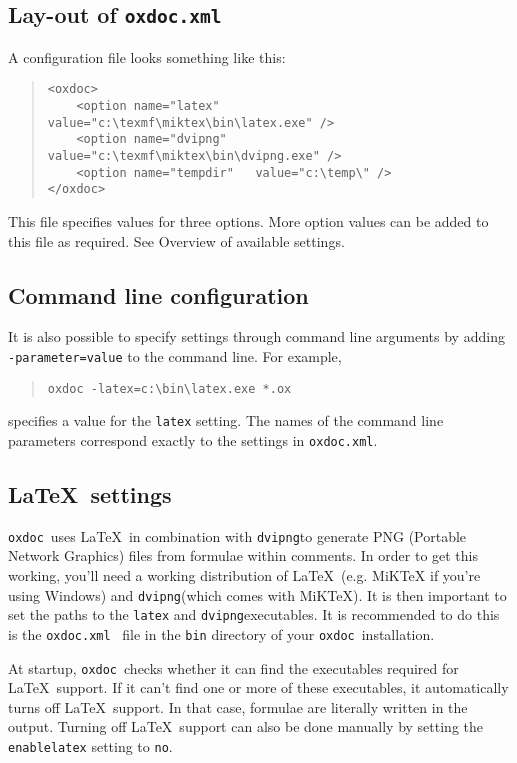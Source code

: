 \documentclass{article}
\newcommand\oxdoc{{\tt oxdoc}}
\newcommand\oxdocxml{{\tt oxdoc.xml}}
\newcommand\dvipng{{\tt dvipng}}
\begin{document}
\subsection{Lay-out of \oxdocxml}
A configuration file looks something like this:

\begin{quote}
\begin{verbatim}
<oxdoc>
	<option name="latex"     value="c:\texmf\miktex\bin\latex.exe" />
	<option name="dvipng"    value="c:\texmf\miktex\bin\dvipng.exe" />
	<option name="tempdir"   value="c:\temp\" />
</oxdoc>
\end{verbatim}
\end{quote}

This file specifies values for three options. More option values can be added to
this file as required. See Overview of available settings.

\subsection{Command line configuration}
It is also possible to specify settings through command line arguments
by adding {\tt -parameter=value} to the command line. 
For example,
\begin{quote}
\begin{verbatim}
oxdoc -latex=c:\bin\latex.exe *.ox
\end{verbatim}
\end{quote}
specifies a value for the {\tt latex} setting. The names of the
command line parameters correspond exactly to the settings in 
\oxdocxml.

\subsection{\LaTeX~settings}
\oxdoc~uses \LaTeX~in combination with \dvipng to generate PNG
(Portable Network Graphics) files from formulae within comments. In order to get this
working, you'll need a working distribution of \LaTeX~(e.g. MiKTeX
if you're using Windows) and \dvipng (which comes with MiKTeX). It is then important
to set the paths to the {\tt latex} and \dvipng executables. It is recommended to do this is the \oxdocxml~
file in the {\tt bin} directory of your \oxdoc~installation.

At startup, \oxdoc~checks whether it can find the executables required for \LaTeX~support. If
it can't find one or more of these executables, it automatically turns off \LaTeX~support. In that case,
formulae are literally written in the output. Turning off \LaTeX~support can also be done manually by
setting the {\tt enablelatex} setting to {\tt no}.
\end{document}
